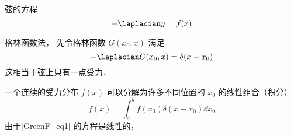 
\begin{issues}
\issueDraft
\end{issues}


弦的方程
\begin{equation}\label{GreenF_eq1}
-\laplacian y = f(x)
\end{equation}

格林函数法， 先令格林函数 $G(x_0, x)$ 满足
\begin{equation}
-\laplacian G(x_0, x) = \delta(x - x_0)
\end{equation}
这相当于弦上只有一点受力．

一个连续的受力分布 $f(x)$ 可以分解为许多不同位置的 $x_0$ 的线性组合（积分）
\begin{equation}
f(x) = \int_a^b f(x_0) \delta(x - x_0) \dd{x_0}
\end{equation}
由于\autoref{GreenF_eq1} 的方程是线性的， 
